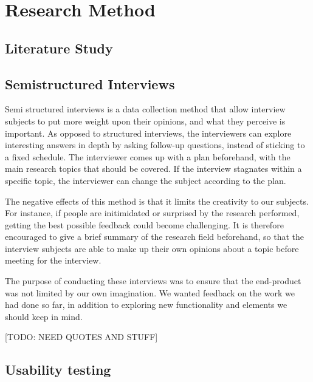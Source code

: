 \chapter{Research Method}
\label{sec:researchmethod}


\section{Literature Study}

\section{Semistructured Interviews}

Semi structured interviews is a data collection method that allow interview subjects to put more weight upon their opinions, and what they perceive is important. As opposed to structured interviews, the interviewers can explore interesting answers in depth by asking follow-up questions, instead of sticking to a fixed schedule. The interviewer comes up with a plan beforehand, with the main research topics that should be covered. If the interview stagnates within a specific topic, the interviewer can change the subject according to the plan.

The negative effects of this method is that it limits the creativity to our subjects. For instance, if people are initimidated or surprised by the research performed, getting the best possible feedback could become challenging. It is therefore encouraged to give a brief summary of the research field beforehand, so that the interview subjects are able to make up their own opinions about a topic before meeting for the interview.   

The purpose of conducting these interviews was to ensure that the end-product was not limited by our own imagination. We wanted feedback on the work we had done so far, in addition to exploring new functionality and elements we should keep in mind.

[TODO: NEED QUOTES AND STUFF]

\section{Usability testing}


